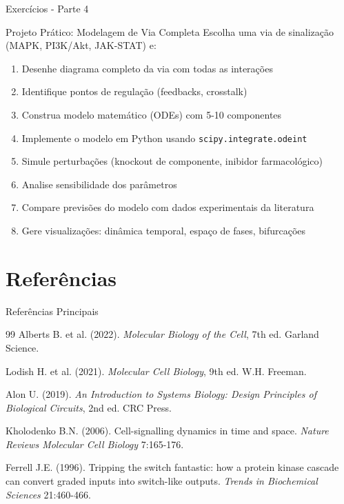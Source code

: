 \begin{frame}{Exercícios - Parte 4}
\begin{alertblock}{Projeto Prático: Modelagem de Via Completa}
Escolha uma via de sinalização (MAPK, PI3K/Akt, JAK-STAT) e:
\begin{enumerate}
    \item Desenhe diagrama completo da via com todas as interações
    \item Identifique pontos de regulação (feedbacks, crosstalk)
    \item Construa modelo matemático (ODEs) com 5-10 componentes
    \item Implemente o modelo em Python usando \texttt{scipy.integrate.odeint}
    \item Simule perturbações (knockout de componente, inibidor farmacológico)
    \item Analise sensibilidade dos parâmetros
    \item Compare previsões do modelo com dados experimentais da literatura
    \item Gere visualizações: dinâmica temporal, espaço de fases, bifurcações
\end{enumerate}
\end{alertblock}
\end{frame}

\section{Referências}

\begin{frame}{Referências Principais}
\begin{thebibliography}{99}
 Alberts B. et al. (2022). \textit{Molecular Biology of the Cell}, 7th ed. Garland Science.

 Lodish H. et al. (2021). \textit{Molecular Cell Biology}, 9th ed. W.H. Freeman.

 Alon U. (2019). \textit{An Introduction to Systems Biology: Design Principles of Biological Circuits}, 2nd ed. CRC Press.

 Kholodenko B.N. (2006). Cell-signalling dynamics in time and space. \textit{Nature Reviews Molecular Cell Biology} 7:165-176.

 Ferrell J.E. (1996). Tripping the switch fantastic: how a protein kinase cascade can convert graded inputs into switch-like outputs. \textit{Trends in Biochemical Sciences} 21:460-466.
\end{thebibliography}
\end{frame}

